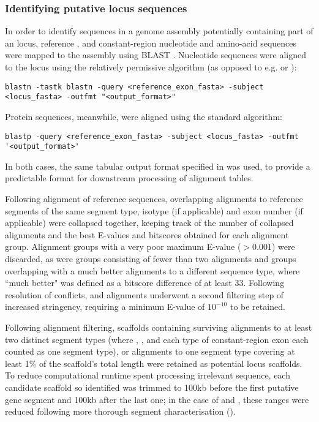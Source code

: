 \subsubsection{Identifying putative locus sequences}
\label{sec:methods_comp_locus_scaffolds}

In order to identify sequences in a genome assembly potentially containing part of an \igh{} locus, reference \vh, \jh and constant-region nucleotide and amino-acid sequences were mapped to the assembly using BLAST \parencite{altschul1990blast,altschul1997blast}. Nucleotide sequences were aligned to the locus using the relatively permissive  algorithm (as opposed to e.g.  or ):

\begin{lstlisting}
blastn -tastk blastn -query <reference_exon_fasta> -subject <locus_fasta> -outfmt "<output_format>"
\end{lstlisting}

Protein sequences, meanwhile, were aligned using the standard  algorithm:

\begin{lstlisting}
blastp -query <reference_exon_fasta> -subject <locus_fasta> -outfmt '<output_format>'
\end{lstlisting}

In both cases, the same tabular output format specified in  was used, to provide a predictable format for downstream processing of  alignment tables.

Following alignment of reference sequences, overlapping alignments to reference segments of the same segment type, isotype (if applicable) and exon number (if applicable) were collapsed together, keeping track of the number of collapsed alignments and the best E-values and bitscores obtained for each alignment group. Alignment groups with a very poor maximum E-value ($> 0.001$) were discarded, as were groups consisting of fewer than two alignments and groups overlapping with a much better alignments to a different sequence type, where ``much better" was defined as a bitscore difference of at least 33. Following resolution of conflicts, \vh and \ch alignments underwent a second filtering step of increased stringency, requiring a minimum E-value of $10^{-10}$ to be retained. 

Following alignment filtering, scaffolds containing surviving alignments to at least two distinct segment types (where \vh, \jh, and each type of constant-region exon each counted as one segment type), or alignments to one segment type covering at least 1\% of the scaffold's total length were retained as potential locus scaffolds. To reduce computational runtime spent processing irrelevant sequence, each candidate scaffold so identified was trimmed to 100kb before the first putative gene segment and 100kb after the last one; in the case of \nfu and \xma, these ranges were reduced following more thorough segment characterisation ().

